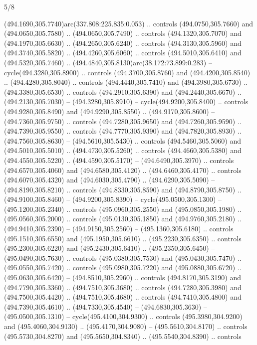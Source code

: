 \begin{flagdescription}{5/8}
\begin{scope}[xshift=0.5\flaglength,yshift=0.5\flagwidth,scale=\flagwidth/475.63]
\begin{scope}[y=0.8pt, x=0.8pt, yscale=-1, xscale=1,shift={(-450,-300)}]
\begin{scope}[cm={{1.0,0.0,0.0,1.0,(-0.0002,0.12556)}},cm={{1.0,0.0,0.0,1.0,(0.00179,0.0)}}]
\begin{scope}[cm={{1.11592,0.0,0.0,1.11592,(-106.89933,-41.77764)}}]
\begin{scope}[draw=black,fill=cfff]
\begin{scope}[fill=black]
  (494.1690,305.7740)arc(337.808:225.835:0.053) .. controls (494.0750,305.7660)
  and (494.0650,305.7580) .. (494.0650,305.7490) .. controls (494.1320,305.7070)
  and (494.1970,305.6630) .. (494.2650,305.6240) .. controls (494.3130,305.5960)
  and (494.3740,305.5820) .. (494.4260,305.6060) .. controls (494.5010,305.6410)
  and (494.5320,305.7460) .. (494.4840,305.8130)arc(38.172:73.899:0.283) --
  cycle(494.3280,305.8900) .. controls (494.3700,305.8760) and
  (494.4200,305.8540) .. (494.4280,305.8040) .. controls (494.4440,305.7410) and
  (494.3980,305.6730) .. (494.3380,305.6530) .. controls (494.2910,305.6390) and
  (494.2440,305.6670) .. (494.2130,305.7030) -- (494.3280,305.8910) --
  cycle(494.9200,305.8400) .. controls (494.9280,305.8490) and
  (494.9290,305.8550) .. (494.9170,305.8600) -- (494.7360,305.9750) .. controls
  (494.7280,305.9650) and (494.7260,305.9590) .. (494.7390,305.9550) .. controls
  (494.7770,305.9390) and (494.7820,305.8930) .. (494.7560,305.8630) --
  (494.5610,305.5430) .. controls (494.5460,305.5060) and (494.5010,305.5010) ..
  (494.4730,305.5260) .. controls (494.4660,305.5380) and (494.4550,305.5220) ..
  (494.4590,305.5170) -- (494.6490,305.3970) .. controls (494.6570,305.4060) and
  (494.6580,305.4120) .. (494.6460,305.4170) .. controls (494.6070,305.4320) and
  (494.6030,305.4790) .. (494.6290,305.5090) -- (494.8190,305.8210) .. controls
  (494.8330,305.8590) and (494.8790,305.8750) .. (494.9100,305.8460) --
  (494.9200,305.8390) -- cycle(495.0500,305.1300) -- (495.1200,305.2340) ..
  controls (495.0960,305.2550) and (495.0850,305.1980) .. (495.0560,305.2000) ..
  controls (495.0130,305.1850) and (494.9760,305.2180) .. (494.9410,305.2390) --
  (494.9150,305.2560) -- (495.1360,305.6180) .. controls (495.1510,305.6550) and
  (495.1950,305.6610) .. (495.2230,305.6350) .. controls (495.2300,305.6220) and
  (495.2430,305.6410) .. (495.2350,305.6450) -- (495.0490,305.7630) .. controls
  (495.0380,305.7530) and (495.0430,305.7470) .. (495.0550,305.7420) .. controls
  (495.0980,305.7220) and (495.0880,305.6720) .. (495.0630,305.6420) --
  (494.8510,305.2960) .. controls (494.8170,305.3190) and (494.7790,305.3360) ..
  (494.7510,305.3680) .. controls (494.7280,305.3980) and (494.7500,305.4420) ..
  (494.7510,305.4680) .. controls (494.7410,305.4800) and (494.7390,305.4610) ..
  (494.7330,305.4540) -- (494.6830,305.3630) -- (495.0500,305.1310) --
  cycle(495.4100,304.9300) .. controls (495.3980,304.9200) and
  (495.4060,304.9130) .. (495.4170,304.9080) -- (495.5610,304.8170) .. controls
  (495.5730,304.8270) and (495.5650,304.8340) .. (495.5540,304.8390) .. controls

\end{scope}
\end{scope}
\end{scope}
\end{scope}
\end{scope}
\end{scope}
\end{flagdescription}
